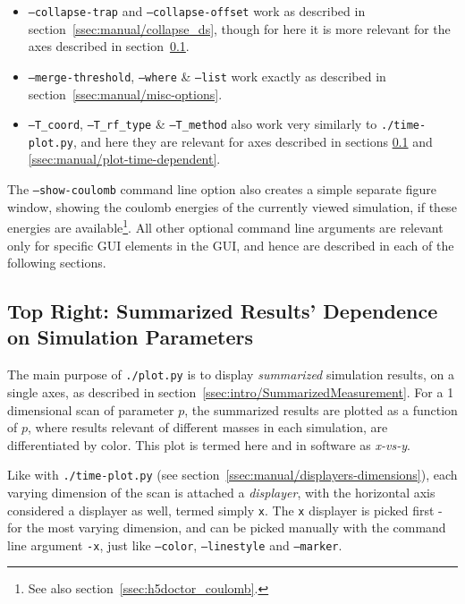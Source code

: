 \begin{itemize}
	\item \texttt{--collapse-trap} and \texttt{--collapse-offset} work as described in section~\ref{ssec:manual/collapse_ds}, though for here it is more relevant for the axes described in section~\ref{ssec:manual/x-vs-y}.
	\item \texttt{--merge-threshold}, \texttt{--where} \& \texttt{--list} work exactly as described in section~\ref{ssec:manual/misc-options}.
	\item \texttt{--T\_coord}, \texttt{--T\_rf\_type} \& \texttt{--T\_method} also work very similarly to \texttt{./time-plot.py}, and here they are relevant for axes described in sections \ref{ssec:manual/x-vs-y} and \ref{ssec:manual/plot-time-dependent}.
\end{itemize}

The \texttt{--show-coulomb} command line option also creates a simple separate figure window, showing the coulomb energies of the currently viewed simulation, if these energies are available\footnote{See also section~\ref{ssec:h5doctor_coulomb}.}. All other optional command line arguments are relevant only for specific GUI elements in the GUI, and hence are described in each of the following sections.

\subsection{Top Right: Summarized Results' Dependence on Simulation Parameters}\label{ssec:manual/x-vs-y}

The main purpose of \texttt{./plot.py} is to display \textit{summarized} simulation results, on a single axes, as described in section~\ref{ssec:intro/SummarizedMeasurement}. For a 1 dimensional scan of parameter $p$, the summarized results are plotted as a function of $p$, where results relevant of different masses in each simulation, are differentiated by color. This plot is termed here and in software as \textit{x-vs-y}.

Like with \texttt{./time-plot.py} (see section~\ref{ssec:manual/displayers-dimensions}), each varying dimension of the scan is attached a \textit{displayer}, with the horizontal axis considered a displayer as well, termed simply \texttt{x}. The \texttt{x} displayer is picked first - for the most varying dimension, and can be picked manually with the command line argument \texttt{-x}, just like \texttt{--color}, \texttt{--linestyle} and \texttt{--marker}.


